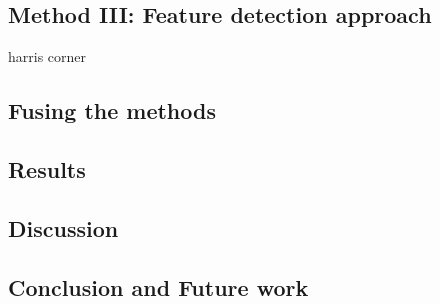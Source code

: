 \subsection{Method III: Feature detection approach}
	harris corner

\subsection{Fusing the methods}

\subsection{Results}
\subsection{Discussion}  %
\subsection{Conclusion and Future work}




% 
% 
% 
% 
% 
% 
% 
% 
